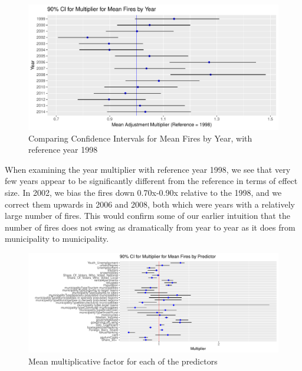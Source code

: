 \documentclass[10pt,a4paper, hidelinks]{article} %
\begin{document}
\begin{figure}[H]
	\centering	\begin{minipage}[c]{0.6\textwidth}
		\includegraphics[width=\textwidth]{../fig/year_multiplier}
	\end{minipage} \hfill
	\begin{minipage}[c]{0.39\textwidth}
		\caption{Comparing Confidence Intervals for Mean Fires by Year, with reference year 1998}
	\label{fig:yearmultiplier}
	\end{minipage}
\end{figure}

When examining the year multiplier with reference year 1998, we see that very few years appear to be significantly different from the reference in terms of effect size.  In 2002, we bias the fires down 0.70x-0.90x relative to the 1998, and we correct them upwards in 2006 and 2008, both which were years with a relatively large number of fires. This would confirm some of our earlier intuition that the number of fires does not swing as dramatically from year to year as it does from municipality to municipality.

\begin{figure}[H]
	\centering
	\includegraphics[width=1\linewidth]{../fig/beta_multiplier}
	\caption{Mean multiplicative factor for each of the predictors}
	\label{fig:betamultiplier}
\end{figure}
\end{document}
